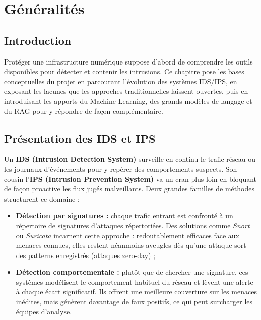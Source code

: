 \documentclass[12pt,a4paper]{report}
\begin{document}
\newpage

\chapter{Généralités}

\section*{Introduction}
\begin{onehalfspace}
Protéger une infrastructure numérique suppose d'abord de comprendre les outils
disponibles pour détecter et contenir les intrusions. Ce chapitre pose les
bases conceptuelles du projet en parcourant l'évolution des systèmes IDS/IPS,
en exposant les lacunes que les approches traditionnelles laissent ouvertes,
puis en introduisant les apports du Machine Learning, des grands modèles de
langage et du RAG pour y répondre de façon complémentaire.
\end{onehalfspace}

\section{Présentation des IDS et IPS}
\begin{onehalfspace}
Un \textbf{IDS (Intrusion Detection System)} surveille en continu le trafic
réseau ou les journaux d'événements pour y repérer des comportements suspects.
Son cousin l'\textbf{IPS (Intrusion Prevention System)} va un cran plus loin
en bloquant de façon proactive les flux jugés malveillants. Deux grandes
familles de méthodes structurent ce domaine :

\begin{itemize}
  \item[\ding{43}] \textbf{Détection par signatures :} chaque trafic entrant
  est confronté à un répertoire de signatures d'attaques répertoriées. Des
  solutions comme \textit{Snort} ou \textit{Suricata} incarnent cette approche :
  redoutablement efficaces face aux menaces connues, elles restent néanmoins
  aveugles dès qu'une attaque sort des patterns enregistrés (attaques zero-day) ;
  \item[\ding{43}] \textbf{Détection comportementale :} plutôt que de chercher
  une signature, ces systèmes modélisent le comportement habituel du réseau et
  lèvent une alerte à chaque écart significatif. Ils offrent une meilleure
  couverture sur les menaces inédites, mais génèrent davantage de faux
  positifs, ce qui peut surcharger les équipes d'analyse.
\end{itemize}
\end{onehalfspace}
\end{document}
